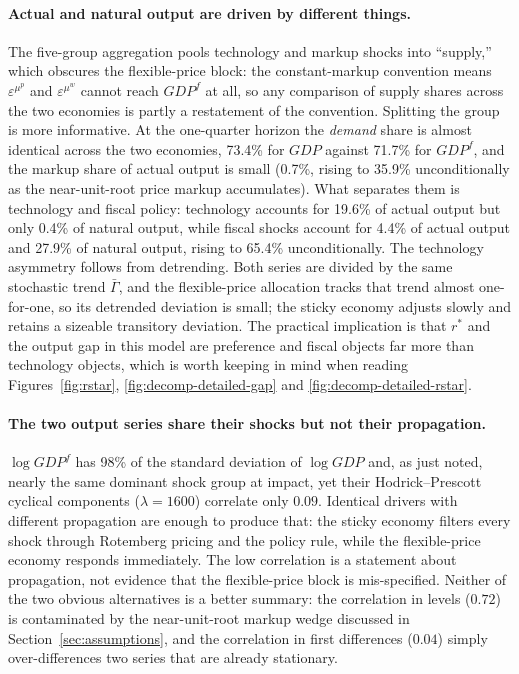 \documentclass[11pt]{article}
\theoremstyle{definition}
\newcommand{\rstar}{r^{*}}
\begin{document}
\paragraph{Actual and natural output are driven by different things.}
The five-group aggregation pools technology and markup shocks into ``supply,'' which obscures the
flexible-price block: the constant-markup convention means $\varepsilon^{\mu^p}$ and
$\varepsilon^{\mu^w}$ cannot reach $GDP^f$ at all, so any comparison of supply shares across the two
economies is partly a restatement of the convention. Splitting the group is more informative. At the
one-quarter horizon the \emph{demand} share is almost identical across the two economies, 73.4\% for
$GDP$ against 71.7\% for $GDP^f$, and the markup share of actual output is small (0.7\%, rising to
35.9\% unconditionally as the near-unit-root price markup accumulates). What separates them is
technology and fiscal policy: technology accounts for 19.6\% of actual output but only 0.4\% of natural
output, while fiscal shocks account for 4.4\% of actual output and 27.9\% of natural output, rising to
65.4\% unconditionally. The technology asymmetry follows from detrending. Both series are divided by
the same stochastic trend $\bar\Gamma$, and the flexible-price allocation tracks that trend almost
one-for-one, so its detrended deviation is small; the sticky economy adjusts slowly and retains a
sizeable transitory deviation. The practical implication is that $\rstar$ and the output gap in this
model are preference and fiscal objects far more than technology objects, which is worth keeping in
mind when reading Figures~\ref{fig:rstar}, \ref{fig:decomp-detailed-gap} and
\ref{fig:decomp-detailed-rstar}.

\paragraph{The two output series share their shocks but not their propagation.}
$\log GDP^f$ has 98\% of the standard deviation of $\log GDP$ and, as just noted, nearly the same
dominant shock group at impact, yet their Hodrick--Prescott cyclical components ($\lambda=1600$)
correlate only $0.09$. Identical drivers with different propagation are enough to produce that: the
sticky economy filters every shock through Rotemberg pricing and the policy rule, while the
flexible-price economy responds immediately. The low correlation is a statement about propagation, not
evidence that the flexible-price block is mis-specified. Neither of the two obvious alternatives is a
better summary: the correlation in levels ($0.72$) is contaminated by the near-unit-root markup wedge
discussed in Section~\ref{sec:assumptions}, and the correlation in first differences ($0.04$) simply
over-differences two series that are already stationary.
\end{document}

